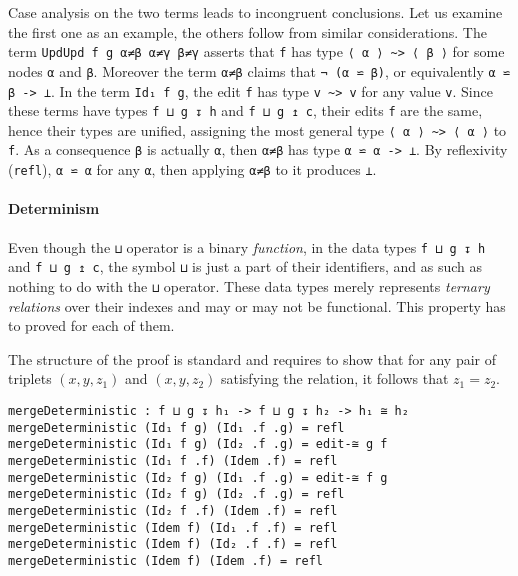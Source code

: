 \documentclass[../Thesis.tex]{subfiles}
\begin{document}
	Case analysis on the two terms leads to incongruent conclusions.
	Let us examine the first one as an example, the others follow from 
	similar considerations.
	The term \texttt{UpdUpd f g α≠β α≠γ β≠γ} asserts that 
	\texttt{f} has type \texttt{⟨ α ⟩ \textasciitilde> ⟨ β ⟩} for some 
	nodes \texttt{α} and \texttt{β}. Moreover the term
	\texttt{α≠β} claims that \texttt{¬ (α ⋍ β)}, or equivalently
	\texttt{α ⋍ β -> ⊥}.
	In the term \texttt{Id₁ f g}, the edit \texttt{f} 
	has type \texttt{v \textasciitilde> v} for any value \texttt{v}. Since these 
	terms have types	\texttt{f ⊔ g ↧ h} and \texttt{f ⊔ g ↥ c}, their edits 
	\texttt{f} are the same, hence their types are unified, assigning the most 
	general type \texttt{⟨ α ⟩ \textasciitilde> ⟨ α ⟩} to \texttt{f}.
	As a consequence \texttt{β} is actually \texttt{α}, then \texttt{α≠β}
	has type \texttt{α ⋍ α -> ⊥}. By reflexivity (\texttt{refl}), \texttt{α ⋍ α} for
	any \texttt{α}, then applying \texttt{α≠β} to it produces \texttt{⊥}.
	
	\paragraph{Determinism}
	\label{par:Determinism}
	Even though the \texttt{⊔} operator is a binary \emph{function}, 
	in the data types \texttt{f ⊔ g ↧ h} and \texttt{f ⊔ g ↥ c}, the symbol
	\texttt{⊔} is just a part of their identifiers, and as such as nothing to
	do with the \texttt{⊔} operator.
	These data types merely represents \emph{ternary relations} over their 
	indexes and may or may not be functional.
	This property has to proved for each of them.
	
	The structure of the proof is standard and requires to show that for any 
	pair of triplets $(x, y, z_1)$ and $(x, y, z_2)$ satisfying
	the relation, it follows that $z_1 = z_2$.
	
\begin{verbatim}
mergeDeterministic : f ⊔ g ↧ h₁ -> f ⊔ g ↧ h₂ -> h₁ ≅ h₂
mergeDeterministic (Id₁ f g) (Id₁ .f .g) = refl
mergeDeterministic (Id₁ f g) (Id₂ .f .g) = edit-≅ g f
mergeDeterministic (Id₁ f .f) (Idem .f) = refl
mergeDeterministic (Id₂ f g) (Id₁ .f .g) = edit-≅ f g
mergeDeterministic (Id₂ f g) (Id₂ .f .g) = refl
mergeDeterministic (Id₂ f .f) (Idem .f) = refl
mergeDeterministic (Idem f) (Id₁ .f .f) = refl
mergeDeterministic (Idem f) (Id₂ .f .f) = refl
mergeDeterministic (Idem f) (Idem .f) = refl
\end{verbatim}
\end{document}
